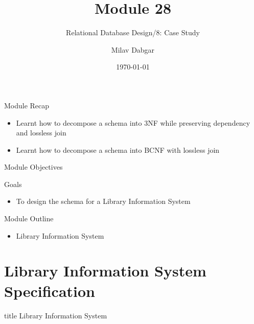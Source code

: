\documentclass[aspectratio=169, xcolor=dvipsnames]{beamer}
\title{Module 28}
\subtitle{Relational Database Design/8: Case Study}
\author{Milav Dabgar}
\institute{www.milav.in}
\date{\today}
\begin{document}
\begin{frame}
    \titlepage
\end{frame}

\begin{frame}{Module Recap}
    \begin{itemize}[<+->]
        \item Learnt how to decompose a schema into 3NF while preserving dependency and lossless join
        \item Learnt how to decompose a schema into BCNF with lossless join
    \end{itemize}
\end{frame}

\begin{frame}{Module Objectives}
    \begin{block}{Goals}
        \begin{itemize}[<+->]
            \item To design the schema for a Library Information System
        \end{itemize}
    \end{block}
\end{frame}

\begin{frame}{Module Outline}
    \begin{itemize}[<+->]
        \item Library Information System
    \end{itemize}
\end{frame}

\section{Library Information System Specification}
\begin{frame}
  \vfill
  \centering
  \begin{beamercolorbox}[sep=8pt,center,shadow=true,rounded=true]{title}
    Library Information System\par%
  \end{beamercolorbox}
  \vfill
\end{frame}
\end{document}

